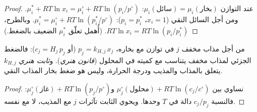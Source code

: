 \begin{proof}
عند التوازن $\mu_i(\text{سائل}) = \mu_i(\text{بخار})$: $\mu_i^* +
RT\ln x_i = \mu_i^\circ + RT\ln(p_i/p^\circ)$. ومن أجل السائل النقي ($x_i = 1$،
$p_i = p_i^*$): $\mu_i^* = \mu_i^\circ + RT\ln(p_i^*/p^\circ)$. وبالطرح،
$RT\ln x_i = RT\ln(p_i/p_i^*)$. (أُهمل تعلّق $\mu_i^*$ الضعيف
بالضغط.)
\end{proof}

\begin{proposition}\label{prop:b2:chemical-potential:henry}
من أجل مذاب مخفف $j$ في توازن مع بخاره، $p_j = k_{H,j}\,x_j$
(أو $c_j = H_j\,p_j$): فالضغط الجزئي لمذاب مخفف يتناسب مع كميته في
المحلول (\emph{قانون هنري}). و\emph{ثابت
هنري}
$k_{H,j}$ يتعلق بالمذاب والمذيب ودرجة الحرارة، وليس هو ضغط
بخار المذاب النقي.
\end{proposition}

\begin{proof}
نساوي بين $\mu_j^\circ(\text{محلول}) + RT\ln(c_j/c^\circ)$ 
و$\mu_j^\circ(\text{غاز}) + RT\ln(p_j/p^\circ)$: فالنسبة $c_j/p_j$ دالة في $T$
وحدها. ويحوي الثابت تآثرات $j$ مع المذيب، لا مع
نفسه.
\end{proof}

